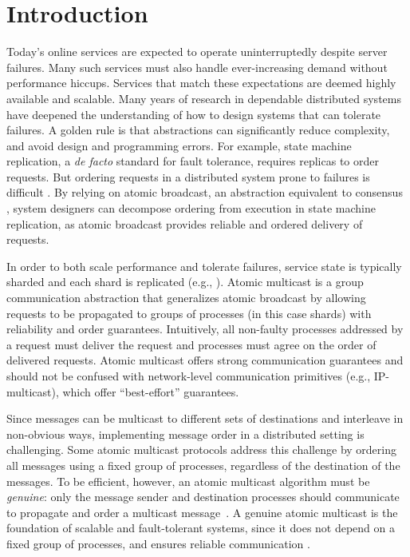 \section{Introduction}
\label{sec:introduction}

Today's online services are expected to operate uninterruptedly despite server failures.
Many such services must also handle ever-increasing demand without performance hiccups.
Services that match these expectations are deemed highly available and scalable.
Many years of research in dependable distributed systems have deepened the understanding of how to design systems that can tolerate failures.
A golden rule is that abstractions can significantly reduce complexity, and avoid design and programming errors.
For example, state machine replication, a \emph{de facto} standard for fault tolerance, requires replicas to order requests.
But ordering requests in a distributed system prone to failures is difficult \cite{FLP85}.
By relying on atomic broadcast, an abstraction equivalent to consensus \cite{HT93,CT96}, system designers can decompose ordering from execution in state machine replication, as atomic broadcast provides reliable and ordered delivery of requests.

In order to both scale performance and tolerate failures, service state is typically sharded and each shard is replicated (e.g., \cite{CDE12,Long2019,Aguilera:2007}).
Atomic multicast is a group communication abstraction that generalizes atomic broadcast by allowing requests to be propagated to groups of processes (in this case shards) with reliability and order guarantees.
Intuitively, all non-faulty processes addressed by a request must deliver the request and processes must agree on the order of delivered requests.
Atomic multicast offers strong communication guarantees and should not be confused with network-level communication primitives (e.g., IP-multicast), which offer ``best-effort'' guarantees.

Since messages can be multicast to different sets of destinations and interleave in non-obvious ways, implementing message order in a distributed setting is challenging.
Some atomic multicast protocols address this challenge by ordering all messages using a fixed group of processes, regardless of the destination of the messages.
To be efficient, however, an atomic multicast algorithm must be \emph{genuine}: only the message sender and destination processes should communicate to propagate and order a multicast message~\cite{GS01b}.
A genuine atomic multicast is the foundation of scalable and fault-tolerant systems, since it does not depend on a fixed group of processes, and ensures reliable communication \cite{Coelho2017}.

